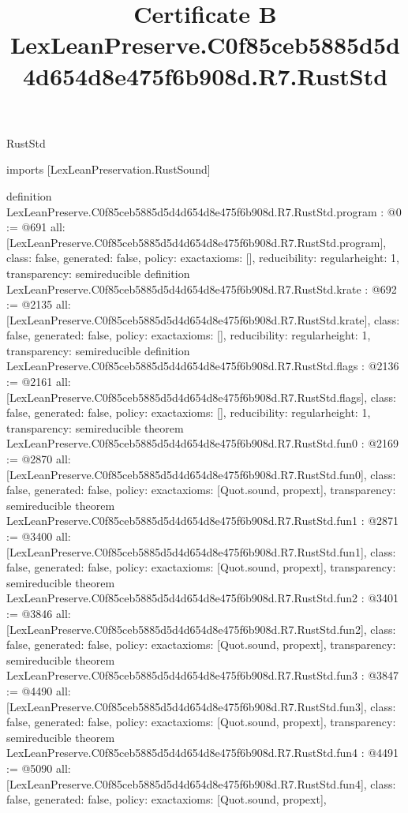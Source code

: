 \begin{lexlean}{RustStd}
\title{Certificate B LexLeanPreserve.C0f85ceb5885d5d4d654d8e475f6b908d.R7.RustStd}
\begin{coremodule}
imports [LexLeanPreservation.RustSound]

definition LexLeanPreserve.C0f85ceb5885d5d4d654d8e475f6b908d.R7.RustStd.program : @0 := @691 {
  all: [LexLeanPreserve.C0f85ceb5885d5d4d654d8e475f6b908d.R7.RustStd.program],
  class: false,
  generated: false,
  policy: exact{axioms: []},
  reducibility: regular{height: 1},
  transparency: semireducible
}
definition LexLeanPreserve.C0f85ceb5885d5d4d654d8e475f6b908d.R7.RustStd.krate : @692 := @2135 {
  all: [LexLeanPreserve.C0f85ceb5885d5d4d654d8e475f6b908d.R7.RustStd.krate],
  class: false,
  generated: false,
  policy: exact{axioms: []},
  reducibility: regular{height: 1},
  transparency: semireducible
}
definition LexLeanPreserve.C0f85ceb5885d5d4d654d8e475f6b908d.R7.RustStd.flags : @2136 := @2161 {
  all: [LexLeanPreserve.C0f85ceb5885d5d4d654d8e475f6b908d.R7.RustStd.flags],
  class: false,
  generated: false,
  policy: exact{axioms: []},
  reducibility: regular{height: 1},
  transparency: semireducible
}
theorem LexLeanPreserve.C0f85ceb5885d5d4d654d8e475f6b908d.R7.RustStd.fun0 : @2169 := @2870 {
  all: [LexLeanPreserve.C0f85ceb5885d5d4d654d8e475f6b908d.R7.RustStd.fun0],
  class: false,
  generated: false,
  policy: exact{axioms: [Quot.sound, propext]},
  transparency: semireducible
}
theorem LexLeanPreserve.C0f85ceb5885d5d4d654d8e475f6b908d.R7.RustStd.fun1 : @2871 := @3400 {
  all: [LexLeanPreserve.C0f85ceb5885d5d4d654d8e475f6b908d.R7.RustStd.fun1],
  class: false,
  generated: false,
  policy: exact{axioms: [Quot.sound, propext]},
  transparency: semireducible
}
theorem LexLeanPreserve.C0f85ceb5885d5d4d654d8e475f6b908d.R7.RustStd.fun2 : @3401 := @3846 {
  all: [LexLeanPreserve.C0f85ceb5885d5d4d654d8e475f6b908d.R7.RustStd.fun2],
  class: false,
  generated: false,
  policy: exact{axioms: [Quot.sound, propext]},
  transparency: semireducible
}
theorem LexLeanPreserve.C0f85ceb5885d5d4d654d8e475f6b908d.R7.RustStd.fun3 : @3847 := @4490 {
  all: [LexLeanPreserve.C0f85ceb5885d5d4d654d8e475f6b908d.R7.RustStd.fun3],
  class: false,
  generated: false,
  policy: exact{axioms: [Quot.sound, propext]},
  transparency: semireducible
}
theorem LexLeanPreserve.C0f85ceb5885d5d4d654d8e475f6b908d.R7.RustStd.fun4 : @4491 := @5090 {
  all: [LexLeanPreserve.C0f85ceb5885d5d4d654d8e475f6b908d.R7.RustStd.fun4],
  class: false,
  generated: false,
  policy: exact{axioms: [Quot.sound, propext]},
}
\end{coremodule}
\end{lexlean}
